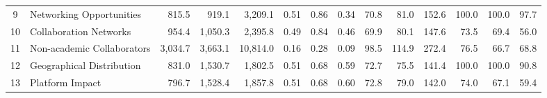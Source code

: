 \begin{table}[htbp]
{\begin{tabular}{cl rrr rrr rrr rrr}
9 & Networking Opportunities
& 815.5 & 919.1 & 3{,}209.1
& 0.51 & 0.86 & 0.34
& 70.8 & 81.0 & 152.6
& 100.0 & 100.0 & 97.7 \\

10 & Collaboration Networks
& 954.4 & 1{,}050.3 & 2{,}395.8
& 0.49 & 0.84 & 0.46
& 69.9 & 80.1 & 147.6
& 73.5 & 69.4 & 56.0 \\

11 & Non-academic Collaborators
& 3{,}034.7 & 3{,}663.1 & 10{,}814.0
& 0.16 & 0.28 & 0.09
& 98.5 & 114.9 & 272.4
& 76.5 & 66.7 & 68.8 \\

12 & Geographical Distribution
& 831.0 & 1{,}530.7 & 1{,}802.5
& 0.51 & 0.68 & 0.59
& 72.7 & 75.5 & 141.4
& 100.0 & 100.0 & 90.8 \\

13 & Platform Impact
& 796.7 & 1{,}528.4 & 1{,}857.8
& 0.51 & 0.68 & 0.60
& 72.8 & 79.0 & 142.0
& 74.0 & 67.1 & 59.4 \\

\bottomrule
\end{tabular}%
}
\end{table}



